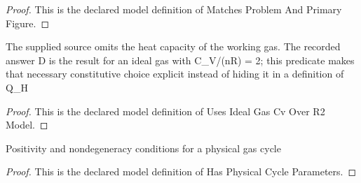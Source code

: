 \begin{proof}
  This is the declared model definition of Matches Problem And Primary Figure.
\end{proof}
\begin{definition}
  \label{def:physics:phyx-mini-0435:phyxminiproblems-problemphyxmini0435-usesidealgascvoverr2model}
  The supplied source omits the heat capacity of the working gas. The recorded answer D is the result for an ideal gas with C\_V/(nR) = 2; this predicate makes that necessary constitutive choice explicit instead of hiding it in a definition of Q\_H
\end{definition}
\begin{proof}
  This is the declared model definition of Uses Ideal Gas Cv Over R2 Model.
\end{proof}
\begin{definition}
  \label{def:physics:phyx-mini-0435:phyxminiproblems-problemphyxmini0435-hasphysicalcycleparameters}
  Positivity and nondegeneracy conditions for a physical gas cycle
\end{definition}
\begin{proof}
  This is the declared model definition of Has Physical Cycle Parameters.
\end{proof}
